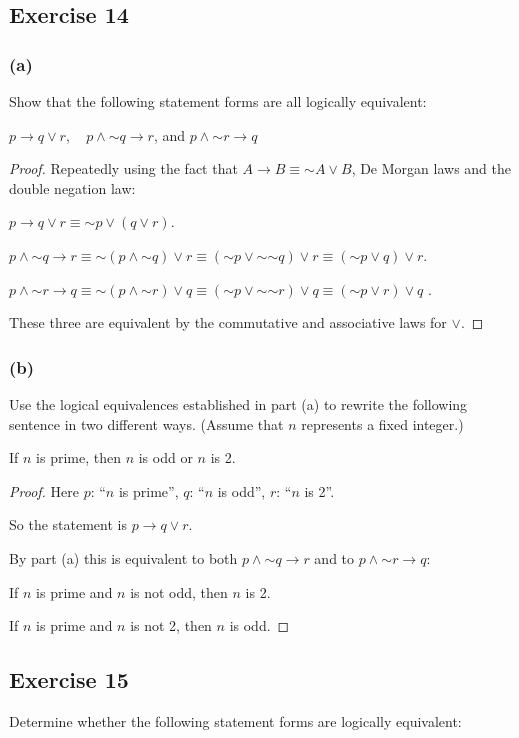 \documentclass[14pt]{extarticle}
\begin{document}
\subsection{Exercise 14} \subsubsection{(a)} Show that the following statement
forms are all logically equivalent:

$p \to q \vee r$, \,\,\, $p \wedge {\sim q} \to r$, and $p \wedge {\sim r} \to
q$

\begin{proof} Repeatedly using the fact that $A \to B \equiv {\sim A} \vee B$,
De Morgan laws and the double negation law:

$p \to q \vee r \equiv {\sim p} \vee (q \vee r)$.

$p \wedge {\sim q} \to r \equiv {\sim (p \wedge {\sim q}) \vee r} \equiv ({\sim
p} \vee {\sim {\sim q}}) \vee r \equiv ({\sim p} \vee q) \vee r$.

$p \wedge {\sim r} \to q \equiv {\sim (p \wedge {\sim r}) \vee q} \equiv ({\sim
p} \vee {\sim {\sim r}}) \vee q \equiv ({\sim p} \vee r) \vee q$ .

These three are equivalent by the commutative and associative laws for $\vee$.
\end{proof}

\subsubsection{(b)} Use the logical equivalences established in part (a) to
rewrite the following sentence in two different ways. (Assume that $n$
represents a fixed integer.)

\begin{center} If $n$ is prime, then $n$ is odd or $n$ is 2. \end{center}
\begin{proof} Here $p$: ``$n$ is prime'', $q$: ``$n$ is odd'', $r$: ``$n$ is
2''.

So the statement is $p \to q \vee r$.

By part (a) this is equivalent to both $p \wedge {\sim q} \to r$ and to $p
\wedge {\sim r} \to q$:

If $n$ is prime and $n$ is not odd, then $n$ is 2.

If $n$ is prime and $n$ is not 2, then $n$ is odd. \end{proof}
\subsection{Exercise 15} Determine whether the following statement forms are
logically equivalent:
\end{document}
